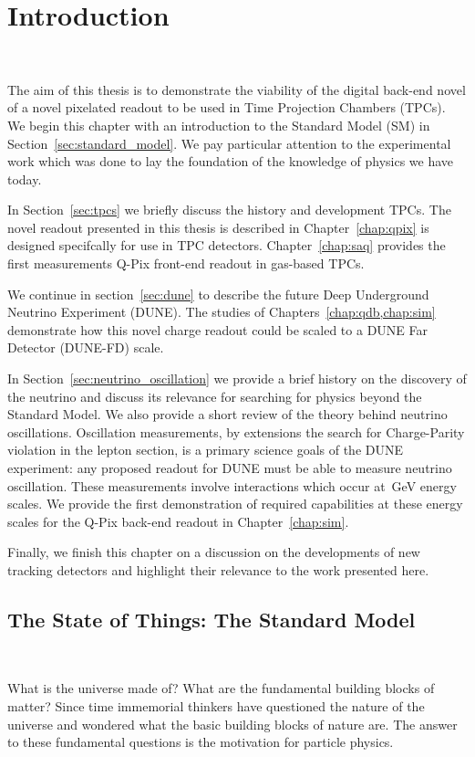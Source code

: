 \chapter{Introduction}~\label{chap:intro}

The aim of this thesis is to demonstrate the viability of the digital back-end novel of a novel pixelated readout to be used in Time Projection Chambers (TPCs). 
We begin this chapter with an introduction to the Standard Model (SM) in Section~\ref{sec:standard_model}.
We pay particular attention to the experimental work which was done to lay the foundation of the knowledge of physics we have today.

In Section~\ref{sec:tpcs} we briefly discuss the history and development TPCs. 
The novel readout presented in this thesis is described in Chapter~\ref{chap:qpix} is designed specifcally for use in TPC detectors.
Chapter~\ref{chap:saq} provides the first measurements Q-Pix front-end readout in gas-based TPCs.

We continue in section~\ref{sec:dune} to describe the future Deep Underground Neutrino Experiment (DUNE).
The studies of Chapters~\cref{chap:qdb,chap:sim} demonstrate how this novel charge readout could be scaled to a DUNE Far Detector (DUNE-FD) scale.

In Section~\ref{sec:neutrino_oscillation} we provide a brief history on the discovery of the neutrino and discuss its relevance for searching for physics beyond the Standard Model.
We also provide a short review of the theory behind neutrino oscillations.
Oscillation measurements, by extensions the search for Charge-Parity violation in the lepton section, is a primary science goals of the DUNE experiment: any proposed readout for DUNE must be able to measure neutrino oscillation.
These measurements involve interactions which occur at~\unit{GeV} energy scales.
We provide the first demonstration of required capabilities at these energy scales for the Q-Pix back-end readout in Chapter~\ref{chap:sim}.

Finally, we finish this chapter on a discussion on the developments of new tracking detectors and highlight their relevance to the work presented here.

\section{The State of Things: The Standard Model}~\label{sec:standard_model}

What is the universe made of?
What are the fundamental building blocks of matter?
Since time immemorial thinkers have questioned the nature of the universe and wondered what the basic building blocks of nature are.
The answer to these fundamental questions is the motivation for particle physics.

